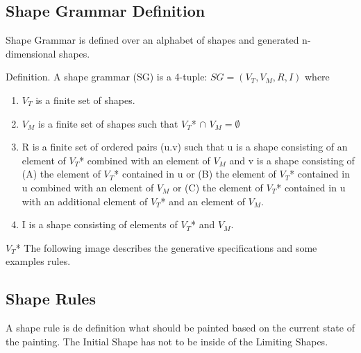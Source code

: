 \documentclass[11pt, a4paper]{report}
\begin{document}
\subsection{Shape Grammar Definition}
Shape Grammar is defined over an alphabet of shapes and generated n-dimensional shapes\citep{shapeGrammars:1972}.
\begin{displayquote} 
    Definition. A shape grammar (SG) is a 4-tuple: $SG = (V_T, V_M, R, I)$ where
    \begin{enumerate}
        \item $V_T$ is a finite set of shapes.
        \item $V_M$ is a finite set of shapes such that $V_T $* $\cap$  $V_M = \emptyset$
        \item R is a finite set of ordered pairs (u.v) such that u is a shape consisting of an element of $V_T $* combined with an element of $V_M$ and v is a shape consisting of (A) the element of $V_T $* contained in u or (B) the element of $V_T $* contained in u combined with an element of $V_M$ or (C) the element of $V_T $* contained in u with an additional element of $V_T$* and an element of $V_M$.
        \item I is a shape consisting of elements of $V_T $* and $V_M$.
    \end{enumerate}
\end{displayquote}
$V_T $* 
The following image describes the generative specifications and some examples rules.
\pagebreak


\subsection{Shape Rules}
A shape rule is de definition what should be painted based on the current state of the painting. The Initial Shape has not to be inside of the Limiting Shapes.

\pagebreak
\end{document}
